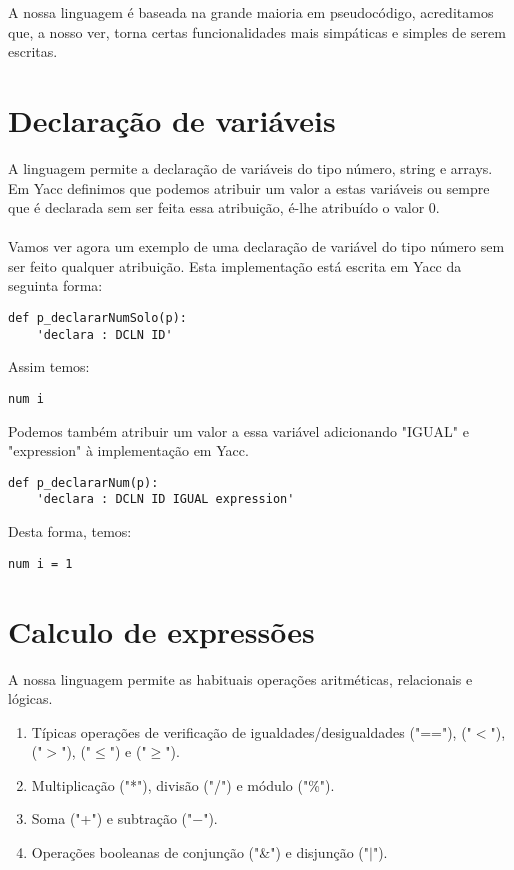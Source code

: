 \documentclass[11pt,a4paper]{report}%
\begin{document}
A nossa linguagem é baseada na grande maioria em pseudocódigo, acreditamos que, a nosso ver, torna certas funcionalidades mais simpáticas e simples de serem escritas.


\section{Declaração de variáveis}

A linguagem permite a declaração de variáveis do tipo número, string e arrays. Em Yacc definimos que podemos atribuir um valor a estas variáveis ou sempre que é declarada sem ser feita essa atribuição, é-lhe atribuído o valor 0.
\\
\\
Vamos ver agora um exemplo de uma declaração de variável do tipo número sem ser feito qualquer atribuição. Esta implementação está escrita em Yacc da seguinta forma:

\begin{verbatim}
def p_declararNumSolo(p): 
    'declara : DCLN ID'
\end{verbatim}

Assim temos:

\begin{lstlisting}[frame=single,numbers=none]
num i
\end{lstlisting}

Podemos também atribuir um valor a essa variável adicionando "IGUAL" e "expression"  à implementação em Yacc.

\begin{verbatim}
def p_declararNum(p): 
    'declara : DCLN ID IGUAL expression'
\end{verbatim}

Desta forma, temos:

\begin{lstlisting}[frame=single,numbers=none]
num i = 1 
\end{lstlisting}

\newpage 

\section{Calculo de expressões}

A nossa linguagem permite as habituais operações aritméticas, relacionais e lógicas.

\begin{enumerate}

\item Típicas operações de verificação de igualdades/desigualdades ("=="), ("$<$"), ("$>$"), ("$\leq$") e ("$\geq$").
\item Multiplicação ("*"), divisão ("/") e módulo ("\%").
\item Soma ("+") e subtração ("$-$").
\item Operações booleanas de conjunção ("\&") e disjunção ("$|$").

\end{enumerate}
\end{document}
